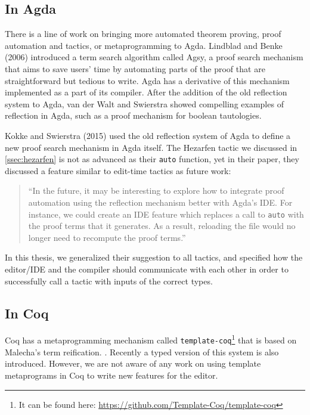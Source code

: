 \subsection{In Agda}

There is a line of work on bringing more automated theorem proving,
proof automation and tactics, or metaprogramming to Agda.
Lindblad and Benke (2006) introduced a term search algorithm called
Agsy, a proof search mechanism that aims to save users' time by automating
parts of the proof that are straightforward but tedious to write.\cite{agsy}
Agda has a derivative of this mechanism implemented as a part of its compiler.
After the addition of the old reflection system to Agda, van der Walt and
Swierstra showed compelling examples of reflection in Agda, such as a proof
mechanism for boolean tautologies.\cite{pfByReflAgda}

Kokke and Swierstra (2015) used the old reflection system of Agda to define a
new proof search mechanism in Agda itself.\cite{autoinagda}
The Hezarfen tactic we discussed in \autoref{ssec:hezarfen} is not as advanced
as their \texttt{auto} function, yet in their paper, they discussed a feature
similar to edit-time tactics as future work:

\begin{quote}
  ``In the future, it may be interesting to explore how to integrate proof
  automation using the reflection mechanism better with Agda's IDE. For
  instance, we could create an IDE feature which replaces a call to
  \texttt{auto} with the proof terms that it generates. As a result, reloading
  the file would no longer need to recompute the proof terms.''\cite{autoinagda}
\end{quote}

In this thesis, we generalized their suggestion to all tactics, and specified
how the editor/IDE and the compiler should communicate with each other
in order to successfully call a tactic with inputs of the correct types.

\subsection{In Coq}

Coq has a metaprogramming mechanism called
\texttt{template-coq}\footnote{It can be found here:
\url{https://github.com/Template-Coq/template-coq}} that is based on
Malecha's term reification. \cite{malecha-phd}. Recently a typed
version of this system is also introduced. \cite{typed-template-coq}
However, we are not aware of any work on using template metaprograms in Coq to
write new features for the editor.
